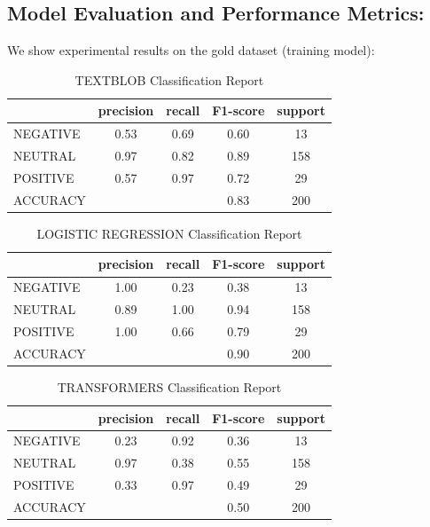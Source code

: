 \documentclass[twoside]{article}
\begin{document}
\subsection{Model Evaluation and Performance Metrics:}
We show experimental results on the gold dataset (training model):

\begin{table}[h]
	\centering
	\caption{TEXTBLOB Classification Report}
	\begin{tabular}{lcccc}
		\toprule
		& precision & recall & F1-score & support \\
		\midrule
		NEGATIVE & 0.53 & 0.69 & 0.60 & 13 \\
		NEUTRAL  & 0.97 & 0.82 & 0.89 & 158 \\
		POSITIVE & 0.57 & 0.97 & 0.72 & 29 \\
		\midrule
		ACCURACY & & & 0.83 & 200 \\
		\bottomrule
	\end{tabular}
\end{table}

\begin{table}[h]
	\centering
	\caption{LOGISTIC REGRESSION Classification Report}
	\begin{tabular}{lcccc}
		\toprule
		& precision & recall & F1-score & support \\
		\midrule
		NEGATIVE & 1.00 & 0.23 & 0.38 & 13 \\
		NEUTRAL  & 0.89 & 1.00 & 0.94 & 158 \\
		POSITIVE & 1.00 & 0.66 & 0.79 & 29 \\
		\midrule
		ACCURACY & & & 0.90 & 200 \\
		\bottomrule
	\end{tabular}
\end{table}

\clearpage 
\begin{table}[h]
	\centering
	\caption{TRANSFORMERS Classification Report}
	\begin{tabular}{lcccc}
		\toprule
		& precision & recall & F1-score & support \\
		\midrule
		NEGATIVE & 0.23 & 0.92 & 0.36 & 13 \\
		NEUTRAL  & 0.97 & 0.38 & 0.55 & 158 \\
		POSITIVE & 0.33 & 0.97 & 0.49 & 29 \\
		\midrule
		ACCURACY & & & 0.50 & 200 \\
		\bottomrule
	\end{tabular}
\end{table}
\end{document}
